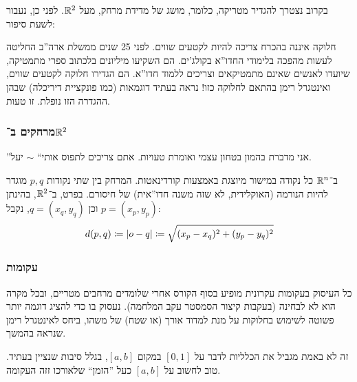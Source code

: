 \documentclass[name=רשימות חדו''א 2א]{../../../tex/classes/noChapterMegasumPreamble}
\begin{document}
	בקרוב נצטרך להגדיר מטריקה, כלומר, מושג של מדידת מרחק, מעל $\mathbb{R}^{2}$. לפני כן, נעבור לשעת סיפור: 

	חלוקה איננה בהכרח צריכה להיות לקטעים שווים.
	לפני 25 שנים ממשלת ארה''ב החליטה לעשות מהפכה בלימודי החדו''א בקולג'ים. הם השקיעו מיליונים בלכתוב ספרי מתמטיקה, שיועדו לאנשים שאינם מתמטיקאים וצריכים ללמוד חדו''א. הם הגדירו חלוקה לקטעים שווים, ואינטגרל רימן בהתאם לחלוקה כזו! נראה בעתיד דוגמאות (כמו פונקציית דיריכלה) שבהן ההגדרה הזו נופלת. זו טעות.

\subsubsection{מרחקים ב־$\mathbb{R}^{2}$}

	''אני מדברת בהמון בטחון עצמי ואומרת טעויות. אתם צריכים לתפוס אותי`` $\sim$ יעל.

	ב־$\mathbb{R}^{n}$ כל נקודה במישור מיוצגת באמצעות קורדינאטות. המרחק בין שתי נקודות $p, q$ מוגדר להיות הנורמה (האוקלידית, לא שזה משנה חדו''אית) של חיסורם. בפרט, ב־$\mathbb{R}^{2}$, בהינתן $p = (x_p, y_p)$ וכן $q = (x_q, y_q)$, נקבל:
	\[ d(p, q) \coloneqq \left \lvert o - q \right \rvert \coloneqq \sqrt{(x_p - x_q)^{2} + (y_p - y_q)^{2}} \]

	\exe{\[ \sof{p - q} = \sof{p - R} + \sof{R - q} \iff R \in [p, q] \]}

\subsubsection{עקומות}
	כל העיסוק בעקומות עקרונית מופיע בסוף הקורס אחרי שלומדים מרחבים מטריים, ובכל מקרה הוא לא לבחינה (בעקבות קיצור הסמסטר עקב המלחמה). נעסוק בו כדי להציג דוגמה יותר פשוטה לשימוש בחלוקות על מנת למדוד אורך (או שטח) של משהו, ביחס לאינטגרל רימן שנראה בהמשך.

	זה לא באמת מגביל את הכלליות לדבר על $[0, 1]$ במקום $[a, b]$, בגלל סיבות שנציין בעתיד. טוב לחשוב על $[a, b]$ כעל ''הזמן`` שלאורכו זזה העקומה.
\end{document}

